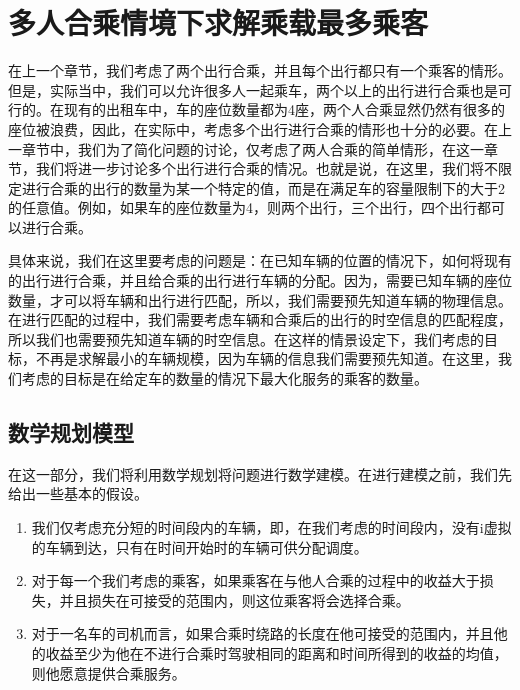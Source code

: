 \chapter{多人合乘情境下求解乘载最多乘客}
\label{chap:ridesharing}

在上一个章节，我们考虑了两个出行合乘，并且每个出行都只有一个乘客的情形。但是，实际当中，我们可以允许很多人一起乘车，两个以上的出行进行合乘也是可行的。在现有的出租车中，车的座位数量都为4座，两个人合乘显然仍然有很多的座位被浪费，因此，在实际中，考虑多个出行进行合乘的情形也十分的必要。在上一章节中，我们为了简化问题的讨论，仅考虑了两人合乘的简单情形，在这一章节，我们将进一步讨论多个出行进行合乘的情况。也就是说，在这里，我们将不限定进行合乘的出行的数量为某一个特定的值，而是在满足车的容量限制下的大于2的任意值。例如，如果车的座位数量为4，则两个出行，三个出行，四个出行都可以进行合乘。
\par
具体来说，我们在这里要考虑的问题是：在已知车辆的位置的情况下，如何将现有的出行进行合乘，并且给合乘的出行进行车辆的分配。因为，需要已知车辆的座位数量，才可以将车辆和出行进行匹配，所以，我们需要预先知道车辆的物理信息。在进行匹配的过程中，我们需要考虑车辆和合乘后的出行的时空信息的匹配程度，所以我们也需要预先知道车辆的时空信息。在这样的情景设定下，我们考虑的目标，不再是求解最小的车辆规模，因为车辆的信息我们需要预先知道。在这里，我们考虑的目标是在给定车的数量的情况下最大化服务的乘客的数量。

\section{数学规划模型}
在这一部分，我们将利用数学规划将问题进行数学建模。在进行建模之前，我们先给出一些基本的假设。
\begin{enumerate}
\item 我们仅考虑充分短的时间段内的车辆，即，在我们考虑的时间段内，没有i虚拟的车辆到达，只有在时间开始时的车辆可供分配调度。
\item 对于每一个我们考虑的乘客，如果乘客在与他人合乘的过程中的收益大于损失，并且损失在可接受的范围内，则这位乘客将会选择合乘。
\item 对于一名车的司机而言，如果合乘时绕路的长度在他可接受的范围内，并且他的收益至少为他在不进行合乘时驾驶相同的距离和时间所得到的收益的均值，则他愿意提供合乘服务。
\end{enumerate}

